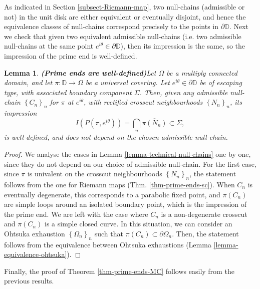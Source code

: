 \documentclass[11pt,a4paper,reqno]{amsart}
\theoremstyle{plain}
\newtheorem{lemma}[thm]{Lemma}
\theoremstyle{definition}
\theoremstyle{plain}
\begin{document}
As indicated in Section \ref{subsect-Riemann-map}, two null-chains (admissible or not) in the unit disk are either equivalent or eventually disjoint, and hence the equivalence classes of null-chains correspond precisely to the points in $ \partial\mathbb{D} $. Next we check that given two equivalent admissible null-chains (i.e. two admissible null-chains at the same point $ e^{i\theta}\in\partial\mathbb{D} $), then its impression is the same, so the impression of the prime end is well-defined.

\begin{lemma}{\bf (Prime ends are well-defined)}\label{lemma-impression}
Let $ \Omega $ be a multiply connected domain, and let $\pi\colon\mathbb{D}\to\Omega $ be a universal covering. Let $ e^{i\theta} \in\partial\mathbb{D}$ be of escaping type, with associated boundary component $ \Sigma $. Then,  given any admissible null-chain $ \left\lbrace C_n\right\rbrace _n $ for $ \pi $ at $ e^{i\theta} $, with rectified crosscut neighbourhoods $ \left\lbrace N_n\right\rbrace _n $, its {impression}
\[I (P(\pi, e^{i\theta}))=\bigcap\limits_n \overline{\pi (N_n)}\subset \Sigma,\] is well-defined, and does not depend on the chosen admissible null-chain.
\end{lemma}
\begin{proof}
	We analyse the cases in Lemma \ref{lemma-technical-null-chains} one by one, since they do not depend on our choice of admissible null-chain. For the first case, since $ \pi $ is univalent on the crosscut neighbourhoods $ \left\lbrace N_n\right\rbrace _n $, the statement follows from the one for Riemann maps (Thm. \ref{thm-prime-ends-sc}).  When $ C_n $ is eventually degenerate, this corresponds to a parabolic fixed point, and $ \pi(C_n) $ are simple loops around an isolated boundary point, which is the impression of the prime end. We are left with the case where $ C_n $ is a non-degenerate crosscut and $ \pi (C_n) $ is a simple closed curve. In this situation, we can consider an Ohtsuka exhaustion $ \left\lbrace \Omega_n\right\rbrace _n $ such that $ \pi (C_n) \subset \partial\Omega_n$. Then, the statement follows from the equivalence between Ohtsuka exhaustions (Lemma \ref{lemma-equivalence-ohtsuka}).
\end{proof}

Finally, the proof of Theorem \ref{thm-prime-ends-MC} follows easily from the previous results.
\end{document}
